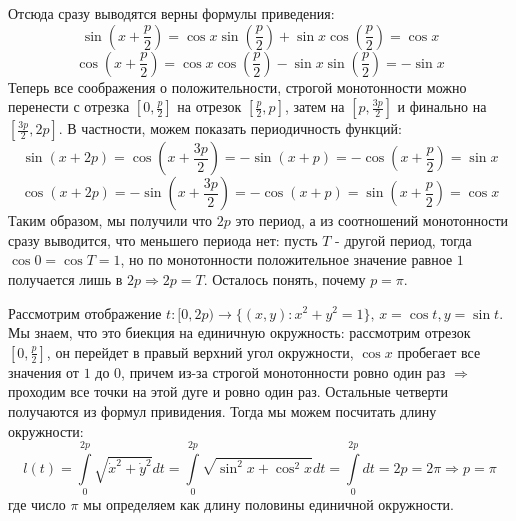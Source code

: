 \documentclass[12pt]{article}
\theoremstyle{definition}
\newcommand{\ddint}[2]{\displaystyle\int\limits_{#1}^{#2}}
\begin{document}
Отсюда сразу выводятся верны формулы приведения:
$$
	\sin{\left(x + \frac{p}{2}\right)} = \cos{x}\sin{\left(\frac{p}{2}\right)} + \sin{x} \cos{\left(\frac{p}{2}\right)} = \cos{x}
$$
$$
	\cos{\left(x + \frac{p}{2}\right)} = \cos{x}\cos{\left(\frac{p}{2}\right)} - \sin{x} \sin{\left(\frac{p}{2}\right)} = -\sin{x}
$$
Теперь все соображения о положительности, строгой монотонности можно перенести с отрезка $\left[0,\frac{p}{2}\right]$ на отрезок $\left[\frac{p}{2},p\right]$, затем на $\left[p, \frac{3p}{2}\right]$ и финально на $\left[\frac{3p}{2}, 2p\right]$. В частности, можем показать периодичность функций:
$$
	\sin{\left(x + 2p\right)} = \cos{\left(x + \dfrac{3p}{2}\right)} = -\sin{\left(x  + p\right)} = -\cos{\left(x + \dfrac{p}{2}\right)} = \sin{x}
$$
$$
	\cos{\left(x + 2p\right)} = -\sin{\left(x + \dfrac{3p}{2}\right)} = -\cos{\left(x  + p\right)} = \sin{\left(x + \dfrac{p}{2}\right)} = \cos{x}
$$
Таким образом, мы получили что $2p$ это период, а из соотношений монотонности сразу выводится, что меньшего периода нет: пусть  $T$ - другой период, тогда $\cos{0} = \cos{T} = 1$, но по монотонности положительное значение равное $1$ получается лишь в $2p \Rightarrow 2p = T$. Осталось понять, почему $p = \pi$.

Рассмотрим отображение $t \colon [0,2p) \to \{(x,y) \colon x^2 + y^2 = 1\}, \, x = \cos{t}, y = \sin{t}$. Мы знаем, что это биекция на единичную окружность: рассмотрим отрезок $\left[0, \frac{p}{2}\right]$, он перейдет в правый верхний угол окружности, $\cos{x}$ пробегает все значения от $1$ до $0$, причем из-за строгой монотонности ровно один раз $\Rightarrow$ проходим все точки на этой дуге и ровно один раз. Остальные четверти получаются из формул привидения. Тогда мы можем посчитать длину окружности:
$$
	l(t) = \ddint{0}{2p}\sqrt{\dot{x}^2 + \dot{y}^2}dt = \ddint{0}{2p}\sqrt{\sin^2{x} + \cos^2{x}}dt = \ddint{0}{2p}dt = 2p = 2\pi \Rightarrow p = \pi
$$
где число $\pi$ мы определяем как длину половины единичной окружности.
\end{document}

